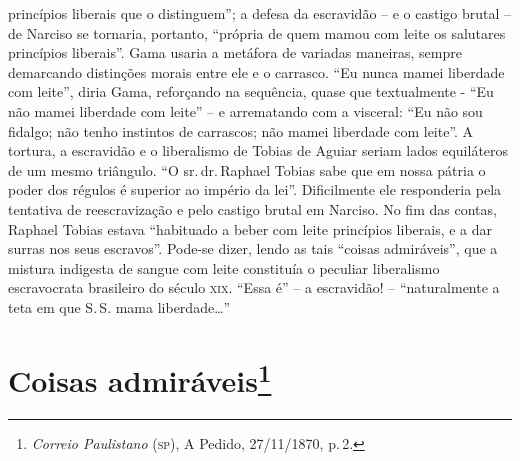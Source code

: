 \begin{argumento}
{princípios liberais que o distinguem''; a defesa da escravidão -- e o
castigo brutal -- de Narciso se tornaria, portanto, ``própria de quem
mamou com leite os salutares princípios liberais''. Gama usaria a
metáfora de variadas maneiras, sempre demarcando distinções morais entre
ele e o carrasco. ``Eu nunca mamei liberdade com leite'', diria Gama,
reforçando na sequência, quase que textualmente - ``Eu não mamei
liberdade com leite'' -- e arrematando com a visceral: ``Eu não sou
fidalgo; não tenho instintos de carrascos; não mamei liberdade com
leite''. A tortura, a escravidão e o liberalismo de Tobias de Aguiar
seriam lados equiláteros de um mesmo triângulo. ``O sr.\,dr.\,Raphael
Tobias sabe que em nossa pátria o poder dos régulos é superior ao
império da lei''. Dificilmente ele responderia pela tentativa de
reescravização e pelo castigo brutal em Narciso. No fim das contas,
Raphael Tobias estava ``habituado a beber com leite princípios liberais,
e a dar surras nos seus escravos''. Pode-se dizer, lendo as tais ``coisas
admiráveis'', que a mistura indigesta de sangue com leite constituía o
peculiar liberalismo escravocrata brasileiro do século \textsc{xix}. ``Essa é'' --
a escravidão! -- ``naturalmente a teta em que S.\,S. mama liberdade\ldots{}''}
\end{argumento}

\chapter{Coisas admiráveis\footnote{\emph{Correio Paulistano} (\textsc{sp}), A Pedido, 27/11/1870,
  p.\,2.}} %

